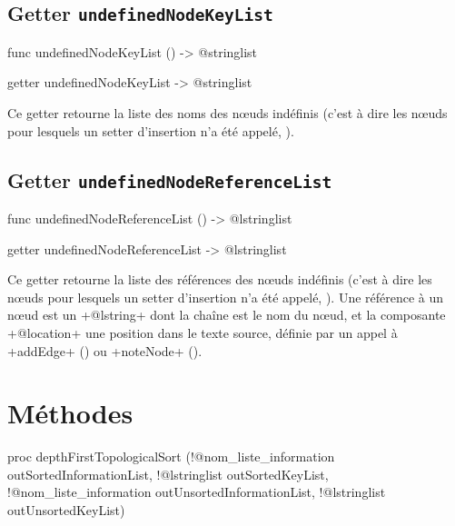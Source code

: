 \subsection{Getter \texttt{undefinedNodeKeyList}}

\begin{galgas4}
func undefinedNodeKeyList () -> @stringlist
\end{galgas4}

\begin{galgas4}
getter undefinedNodeKeyList -> @stringlist
\end{galgas4}

Ce getter retourne la liste des noms des nœuds indéfinis (c'est à dire les nœuds pour lesquels un setter d'insertion n'a été appelé, ).








\subsection{Getter \texttt{undefinedNodeReferenceList}}

\begin{galgas4}
func undefinedNodeReferenceList () -> @lstringlist
\end{galgas4}

\begin{galgas4}
getter undefinedNodeReferenceList -> @lstringlist
\end{galgas4}

Ce getter retourne la liste des références des nœuds indéfinis (c'est à dire les nœuds pour lesquels un setter d'insertion n'a été appelé, ). Une référence à un nœud est un \ggsq+@lstring+ dont la chaîne est le nom du nœud, et la composante \ggsq+@location+ une position dans le texte source, définie par un appel à \ggsq+addEdge+ () ou \ggsq+noteNode+ ().




\section{Méthodes}


\begin{galgas4}
proc depthFirstTopologicalSort (!@nom_liste_information outSortedInformationList,
                             !@lstringlist outSortedKeyList,
                             !@nom_liste_information outUnsortedInformationList,
                             !@lstringlist outUnsortedKeyList)
\end{galgas4}

